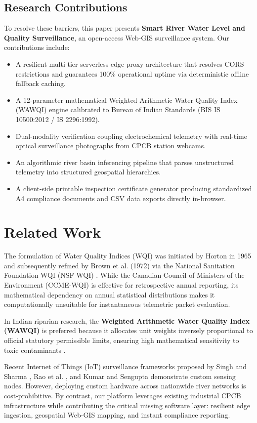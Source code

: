 \documentclass[conference]{IEEEtran}
\begin{document}
\subsection{Research Contributions}
To resolve these barriers, this paper presents \textbf{Smart River Water Level and Quality Surveillance}, an open-access Web-GIS surveillance system. Our contributions include:
\begin{itemize}
    \item A resilient multi-tier serverless edge-proxy architecture that resolves CORS restrictions and guarantees 100\% operational uptime via deterministic offline fallback caching.
    \item A 12-parameter mathematical Weighted Arithmetic Water Quality Index (WAWQI) engine calibrated to Bureau of Indian Standards (BIS IS 10500:2012 / IS 2296:1992).
    \item Dual-modality verification coupling electrochemical telemetry with real-time optical surveillance photographs from CPCB station webcams.
    \item An algorithmic river basin inferencing pipeline that parses unstructured telemetry into structured geospatial hierarchies.
    \item A client-side printable inspection certificate generator producing standardized A4 compliance documents and CSV data exports directly in-browser.
\end{itemize}

\section{Related Work}
The formulation of Water Quality Indices (WQI) was initiated by Horton in 1965 \cite{horton1965} and subsequently refined by Brown et al. (1972) via the National Sanitation Foundation WQI (NSF-WQI) \cite{brown1972}. While the Canadian Council of Ministers of the Environment (CCME-WQI) \cite{ccme2001} is effective for retrospective annual reporting, its mathematical dependency on annual statistical distributions makes it computationally unsuitable for instantaneous telemetric packet evaluation.

In Indian riparian research, the \textbf{Weighted Arithmetic Water Quality Index (WAWQI)} \cite{bis10500, bis2296} is preferred because it allocates unit weights inversely proportional to official statutory permissible limits, ensuring high mathematical sensitivity to toxic contaminants \cite{misra2014, tyagi2013}.

Recent Internet of Things (IoT) surveillance frameworks proposed by Singh and Sharma \cite{singh2021}, Rao et al. \cite{rao2020}, and Kumar and Sengupta \cite{kumar2021} demonstrate custom sensing nodes. However, deploying custom hardware across nationwide river networks is cost-prohibitive. By contrast, our platform leverages existing industrial CPCB infrastructure while contributing the critical missing software layer: resilient edge ingestion, geospatial Web-GIS mapping, and instant compliance reporting.
\end{document}
